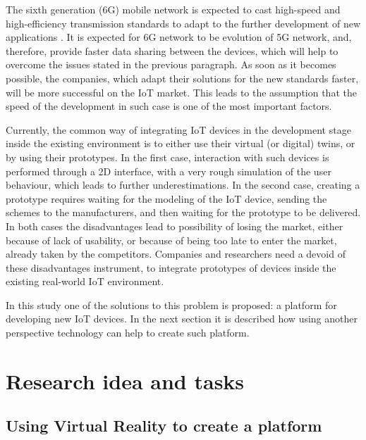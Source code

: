 The sixth generation (6G) mobile network is expected to cast high-speed and high-efficiency transmission standards to adapt to the further development of new applications \cite{liao_information-centric_2021} \cite{huang_survey_2019}. It is expected for 6G network to be evolution of 5G network, and, therefore, provide faster data sharing between the devices, which will help to overcome the issues stated in the previous paragraph. As soon as it becomes possible, the companies, which adapt their solutions for the new standards faster, will be more successful on the IoT market. This leads to the assumption that the speed of the development in such case is one of the most important factors.

Currently, the common way of integrating IoT devices in the development stage inside the existing environment is to either use their virtual (or digital) twins, or by using their prototypes. In the first case, interaction with such devices is performed through a 2D interface, with a very rough simulation of the user behaviour, which leads to further underestimations. In the second case, creating a prototype requires waiting for the modeling of the IoT device, sending the schemes to the manufacturers, and then waiting for the prototype to be delivered. In both cases the disadvantages lead to possibility of losing the market, either because of lack of usability, or because of being too late to enter the market, already taken by the competitors. Companies and researchers need a devoid of these disadvantages instrument, to integrate prototypes of devices inside the existing real-world IoT environment.

In this study one of the solutions to this problem is proposed: a platform for developing new IoT devices. In the next section it is described how using another perspective technology can help to create such platform.

\section{Research idea and tasks}

\subsection{Using Virtual Reality to create a platform}